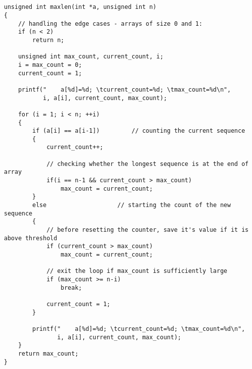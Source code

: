 \documentclass{article}
\begin{document}
\begin{verbatim} 


unsigned int maxlen(int *a, unsigned int n)
{
    // handling the edge cases - arrays of size 0 and 1:
    if (n < 2)                                      
        return n;

    unsigned int max_count, current_count, i;
    i = max_count = 0;
    current_count = 1;

    printf("    a[%d]=%d; \tcurrent_count=%d; \tmax_count=%d\n",
           i, a[i], current_count, max_count);

    for (i = 1; i < n; ++i)
    {
        if (a[i] == a[i-1])         // counting the current sequence
        {
            current_count++;

            // checking whether the longest sequence is at the end of array
            if(i == n-1 && current_count > max_count)
                max_count = current_count;
        }
        else            	    // starting the count of the new sequence
        {
            // before resetting the counter, save it's value if it is above threshold
            if (current_count > max_count)
                max_count = current_count;

            // exit the loop if max_count is sufficiently large
            if (max_count >= n-i)
                break;
                
            current_count = 1;
        }

        printf("    a[%d]=%d; \tcurrent_count=%d; \tmax_count=%d\n",
               i, a[i], current_count, max_count);
    }
    return max_count;
}
\end{verbatim}	
	

\paragraph{}\
\paragraph{}\
\paragraph{}\
\end{document}
